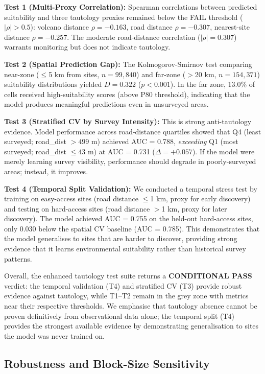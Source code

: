 \documentclass[12pt]{article}
\begin{document}
\textbf{Test 1 (Multi-Proxy Correlation):} Spearman correlations between predicted suitability and three tautology proxies remained below the FAIL threshold ($|\rho| > 0.5$): volcano distance $\rho = -0.163$, road distance $\rho = -0.307$, nearest-site distance $\rho = -0.257$.
The moderate road-distance correlation ($|\rho| = 0.307$) warrants monitoring but does not indicate tautology.

\textbf{Test 2 (Spatial Prediction Gap):} The Kolmogorov-Smirnov test comparing near-zone ($\leq$5 km from sites, $n = 99{,}840$) and far-zone ($>$20 km, $n = 154{,}371$) suitability distributions yielded $D = 0.322$ ($p < 0.001$).
In the far zone, 13.0\% of cells received high-suitability scores (above P80 threshold), indicating that the model produces meaningful predictions even in unsurveyed areas.

\textbf{Test 3 (Stratified CV by Survey Intensity):} This is strong anti-tautology evidence.
Model performance across road-distance quartiles showed that Q4 (least surveyed; road\_dist $> 499$ m) achieved AUC = 0.788, \textit{exceeding} Q1 (most surveyed; road\_dist $\leq 43$ m) at AUC = 0.731 ($\Delta = +0.057$).
If the model were merely learning survey visibility, performance should degrade in poorly-surveyed areas; instead, it improves.

\textbf{Test 4 (Temporal Split Validation):} We conducted a temporal stress test by training on easy-access sites (road distance $\leq$1 km, proxy for early discovery) and testing on hard-access sites (road distance $>$1 km, proxy for later discovery).
The model achieved AUC = 0.755 on the held-out hard-access sites, only 0.030 below the spatial CV baseline (AUC = 0.785).
This demonstrates that the model generalises to sites that are harder to discover, providing strong evidence that it learns environmental suitability rather than historical survey patterns.

Overall, the enhanced tautology test suite returns a \textbf{CONDITIONAL PASS} verdict: the temporal validation (T4) and stratified CV (T3) provide robust evidence against tautology, while T1--T2 remain in the grey zone with metrics near their respective thresholds.
We emphasise that tautology absence cannot be proven definitively from observational data alone; the temporal split (T4) provides the strongest available evidence by demonstrating generalisation to sites the model was never trained on.

\subsection{Robustness and Block-Size Sensitivity}
\end{document}
